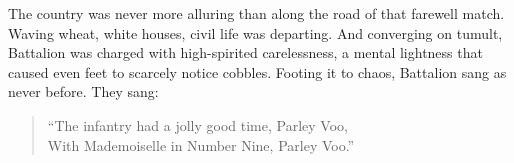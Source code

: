 The country was never more alluring than along the road of that farewell match. Waving wheat, white houses, civil life was departing. And converging on tumult, Battalion was charged with high-spirited carelessness, a mental lightness that caused even feet to scarcely notice cobbles. Footing it to chaos, Battalion sang as never before. They sang:

\begin{verse}
``The infantry had a jolly good time, Parley Voo,\\
With Mademoiselle in Number Nine, Parley Voo.''
\end{verse}